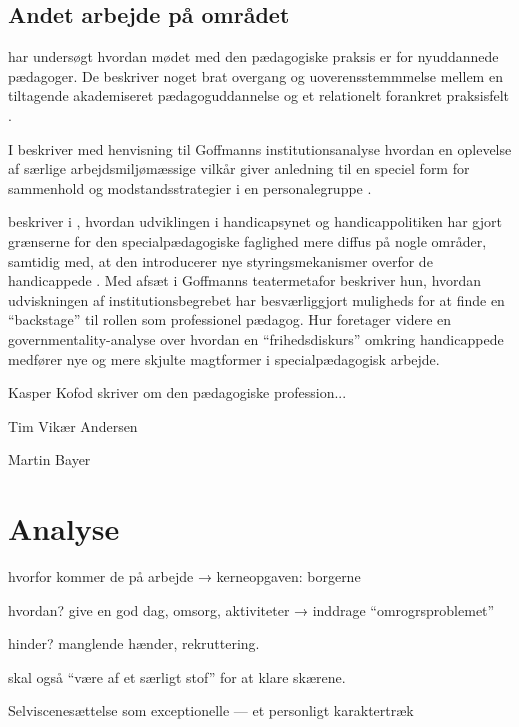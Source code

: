 \subsection{Andet arbejde på området}
\citeauthor{nielsenAttraktivPaPapiret2017} har undersøgt hvordan mødet med den pædagogiske praksis er for nyuddannede pædagoger. De beskriver noget brat overgang og uoverensstemmmelse mellem en tiltagende akademiseret pædagoguddannelse og et relationelt forankret praksisfelt \autocite{nielsenAttraktivPaPapiret2017}.

I  beskriver \citeauthor{dreyerespersenBekymrendeIdentiteterAnbragte2010} med henvisning til Goffmanns institutionsanalyse hvordan en oplevelse af særlige arbejdsmiljømæssige vilkår giver anledning til en speciel form for sammenhold og modstandsstrategier i en personalegruppe \autocite{dreyerespersenBekymrendeIdentiteterAnbragte2010}.

\citeauthor{hurFrigorelsensMagt2015} beskriver i , hvordan udviklingen i handicapsynet og handicappolitiken har gjort grænserne for den specialpædagogiske faglighed mere diffus på nogle områder, samtidig med, at den introducerer nye styringsmekanismer overfor de handicappede \autocite{hurFrigorelsensMagt2015}.
Med afsæt i Goffmanns teatermetafor beskriver hun, hvordan udviskningen af institutionsbegrebet har besværliggjort muligheds for at finde en “backstage” til rollen som professionel pædagog.
Hur foretager videre en governmentality-analyse over hvordan en “frihedsdiskurs” omkring handicappede medfører nye og mere skjulte magtformer i specialpædagogisk arbejde.

Kasper Kofod skriver om den pædagogiske profession...

Tim Vikær Andersen

Martin Bayer

\section{Analyse}
hvorfor kommer de på arbejde → kerneopgaven: borgerne

hvordan? give en god dag, omsorg, aktiviteter → inddrage “omrogrsproblemet” \autocite[s.455ff]{hansbolKonstruktionAfProfessionel2008}

hinder? manglende hænder, rekruttering.

skal også “være af et særligt stof” for at klare skærene.

Selviscenesættelse som exceptionelle --- et personligt karaktertræk

